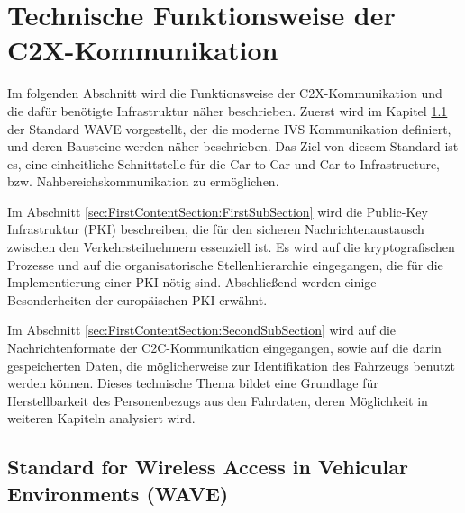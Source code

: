 
\section{Technische  Funktionsweise der C2X-Kommunikation}
\label{ch:FirstContentSection}

Im folgenden Abschnitt wird die Funktionsweise der C2X-Kommunikation und die dafür benötigte Infrastruktur näher beschrieben. Zuerst wird im Kapitel \ref{sec:FirstContentSection:ZeroSubSection} der Standard WAVE vorgestellt, der die moderne IVS Kommunikation definiert, und deren Bausteine werden näher beschrieben. Das Ziel von diesem Standard ist es, eine einheitliche Schnittstelle für die Car-to-Car und Car-to-Infrastructure, bzw. Nahbereichskommunikation zu ermöglichen.

Im Abschnitt \ref{sec:FirstContentSection:FirstSubSection} wird die Public-Key Infrastruktur (PKI) beschreiben, die für den sicheren Nachrichtenaustausch zwischen den Verkehrsteilnehmern essenziell ist. Es wird auf die kryptografischen Prozesse und auf die organisatorische Stellenhierarchie eingegangen, die für die Implementierung einer PKI nötig sind. Abschließend werden einige Besonderheiten der europäischen PKI erwähnt.

Im Abschnitt \ref{sec:FirstContentSection:SecondSubSection} wird auf die Nachrichtenformate der C2C-Kommunikation eingegangen, sowie auf die darin gespeicherten Daten, die möglicherweise zur Identifikation des Fahrzeugs benutzt werden können. Dieses technische Thema bildet eine Grundlage für Herstellbarkeit des Personenbezugs aus den Fahrdaten, deren Möglichkeit in weiteren Kapiteln analysiert wird.

\subsection{Standard for Wireless Access in Vehicular Environments (WAVE)}
\label{sec:FirstContentSection:ZeroSubSection}

